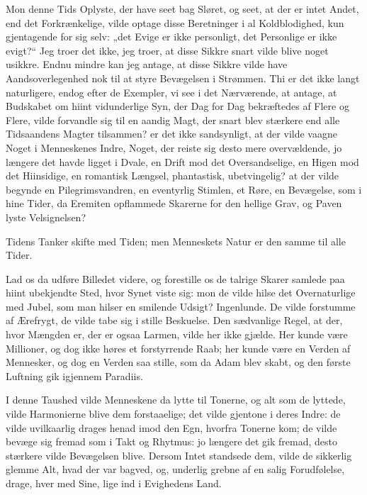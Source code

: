 \documentclass[12pt,a4paper]{book}
\newcommand{\apage}[1]{\marginnote{\footnotesize\textit{[#1]}}}
\begin{document}
Mon denne Tids Oplyste, der have seet bag Sløret, og seet, at der er intet Andet, end det Forkrænkelige, vilde optage disse Beretninger i al Koldblodighed, kun gjentagende for sig selv: „det Evige er ikke personligt, det Personlige er ikke evigt?“ Jeg troer det ikke, jeg troer, at disse Sikkre snart vilde blive noget usikkre. Endnu mindre kan jeg antage, at disse Sikkre vilde have Aandsoverlegenhed nok til at styre Bevægelsen i Strømmen. Thi er det ikke langt naturligere, endog efter de Exempler, vi see i det Nærværende, at antage, at Budskabet om hiint vidunderlige Syn, der Dag for Dag bekræftedes af Flere og Flere, vilde forvandle sig til en aandig Magt, der snart blev stærkere end alle Tidsaandens Magter tilsammen? er det ikke sandsynligt, at der vilde vaagne Noget i Menneskenes Indre, Noget, der reiste sig desto mere overvældende, jo længere det havde ligget i Dvale, en Drift mod det Oversandselige, en Higen mod det Hiinsidige, en romantisk Længsel, phantastisk, ubetvingelig? at der vilde begynde en Pilegrimsvandren, en eventyrlig Stimlen, et Røre, en Bevægelse, som i hine Tider, da Eremiten opflammede Skarerne for den hellige Grav, og Paven lyste Velsignelsen?

Tidens Tanker skifte med Tiden; men Menneskets Natur er den samme til alle Tider.

Lad os da udføre Billedet videre, og forestille os de talrige Skarer samlede paa hiint ubekjendte Sted, hvor Synet viste sig: mon de vilde hilse det Overnaturlige med Jubel, som man hilser en smilende Udsigt? Ingenlunde. De vilde forstumme af Ærefrygt, de vilde tabe sig i stille Beskuelse. Den sædvanlige Regel, at der, hvor Mængden er, der er ogsaa Larmen, vilde her ikke gjælde. Her kunde være Millioner, og dog ikke høres et forstyrrende Raab; her kunde være en Verden af Mennesker, og dog en Verden saa stille, som da Adam blev skabt, og den første Luftning gik igjennem Paradiis.

I \apage{5} denne Taushed vilde Menneskene da lytte til Tonerne, og alt som de lyttede, vilde Harmonierne blive dem forstaaelige; det vilde gjentone i deres Indre: de vilde uvilkaarlig drages henad imod den Egn, hvorfra Tonerne kom; de vilde bevæge sig fremad som i Takt og Rhytmus: jo længere det gik fremad, desto stærkere vilde Bevægelsen blive. Dersom Intet standsede dem, vilde de sikkerlig glemme Alt, hvad der var bagved, og, underlig grebne af en salig Forudfølelse, drage, hver med Sine, lige ind i Evighedens Land.
\end{document}
